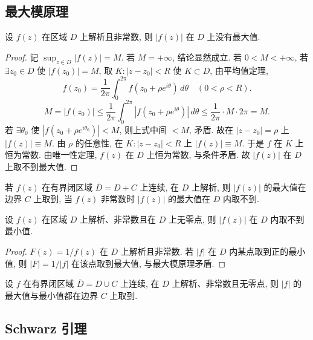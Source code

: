 \documentclass[theorem=false,mathfont=none,openany,sub3section]{easybook}
\begin{document}
\subsection{最大模原理}

\begin{theorem}[最大模原理]
  设 $f(z)$ 在区域 $D$ 上解析且非常数, 则 $|f(z)|$ 在 $D$ 上没有最大值.
\end{theorem}

\begin{proof}
  记 $\sup_{z\in D}|f(z)|=M$.
  若 $M=+\infty$, 结论显然成立.
  若 $0<M<+\infty$, 若 $\exists z_{0}\in D$ 使 $|f(z_{0})|=M$,
  取 $K:|z-z_{0}|<R$ 使 $K\subset D$, 由平均值定理,
  \[
  f(z_{0})=\frac{1}{2\pi}\int_{0}^{2\pi}f(z_{0}+\rho e^{i\theta})\,d\theta\quad(0<\rho<R).
  \]
  \[
  M=|f(z_{0})|\leq\frac{1}{2\pi}\int_{0}^{2\pi}|f(z_{0}+\rho e^{i\theta})|\,d\theta
  \leq\frac{1}{2\pi}\cdot M\cdot2\pi=M.
  \]
  若 $\exists\theta_{0}$ 使 $|f(z_{0}+\rho e^{i\theta_{0}})|<M$, 则上式中间 $<M$, 矛盾. 故在 $|z-z_{0}|=\rho$ 上 $|f(z)|\equiv M$. 由 $\rho$ 的任意性, 在 $K:|z-z_{0}|<R$ 上 $|f(z)|\equiv M$.
  于是 $f$ 在 $K$ 上恒为常数. 由唯一性定理, $f(z)$ 在 $D$ 上恒为常数,
  与条件矛盾. 故 $|f(z)|$ 在 $D$ 上取不到最大值.
\end{proof}

\begin{corollary}
  若 $f(z)$ 在有界闭区域 $\overline{D}=D+C$ 上连续, 在 $D$ 上解析, 则 $|f(z)|$ 的最大值在边界 $C$ 上取到, 当 $f(z)$ 非常数时 $|f(z)|$ 的最大值在 $D$ 内取不到.
\end{corollary}

\begin{theorem}[最小模定理]
  设 $f(z)$ 在区域 $D$ 上解析、非常数且在 $D$ 上无零点, 则 $|f(z)|$ 在 $D$ 内取不到最小值.
\end{theorem}

\begin{proof}
  $F(z)=1/f(z)$ 在 $D$ 上解析且非常数. 若 $|f|$ 在 $D$ 内某点取到正的最小值,
  则 $|F|=1/|f|$ 在该点取到最大值, 与最大模原理矛盾.
\end{proof}

\begin{corollary}
  设 $f$ 在有界闭区域 $\overline D=D\cup C$ 上连续, 在 $D$ 上解析、非常数且无零点,
  则 $|f|$ 的最大值与最小值都在边界 $C$ 上取到.
\end{corollary}

\subsection{Schwarz 引理}
\end{document}
